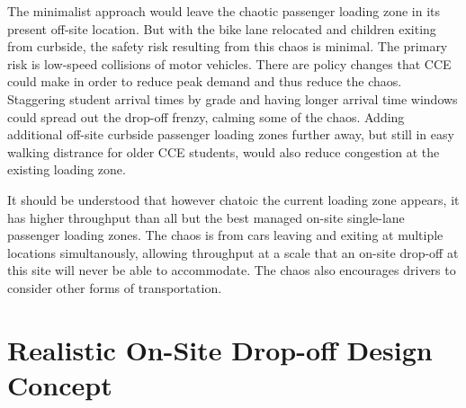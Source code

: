 \documentclass[12pt]{article}
\begin{document}
The minimalist approach would leave the chaotic passenger loading zone
in its present off-site location. But with the bike lane relocated and
children exiting from curbside, the safety risk resulting from this
chaos is minimal.  The primary risk is low-speed collisions of motor
vehicles.  There are policy changes that CCE could make in order to
reduce peak demand and thus reduce the chaos.  Staggering student
arrival times by grade and having longer arrival time windows could
spread out the drop-off frenzy, calming some of the chaos.  Adding
additional off-site curbside passenger loading zones further away, but
still in easy walking distrance for older CCE students, would also
reduce congestion at the existing loading zone.

It should be understood that however chatoic the current loading zone
appears, it has higher throughput than all but the best managed
on-site single-lane passenger loading zones.  The chaos is from cars
leaving and exiting at multiple locations simultanously, allowing
throughput at a scale that an on-site drop-off at this site will never
be able to accommodate.  The chaos also encourages drivers to consider
other forms of transportation.


\section{Realistic On-Site Drop-off Design Concept}
\end{document}
